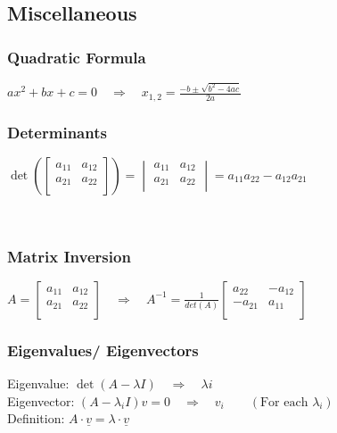 	\subsection{Miscellaneous}
	\begin{minipage}[t]{9.5cm}
		\subsubsection{Quadratic Formula}
			$ax^2+bx+c=0\quad\Rightarrow\quad x_{1,2}=\frac{-b\pm\sqrt{b^2-4ac}}{2a}$
	\end{minipage}
	\hfill
	\begin{minipage}[t]{9.5cm}
		\subsubsection{Determinants}
			$\det\left(
			\begin{bmatrix}
				a_{11}&a_{12}\\
				a_{21}&a_{22}\\
			\end{bmatrix}\right)=
			\begin{vmatrix}
				a_{11}&a_{12}\\
				a_{21}&a_{22}\\
			\end{vmatrix}=a_{11}a_{22}-a_{12}a_{21}$
	\end{minipage}\\


	\begin{minipage}[t]{9.5cm}
		\subsubsection{Matrix Inversion}
			$A=\begin{bmatrix}
						a_{11}&a_{12}\\
						a_{21}&a_{22}\\
				\end{bmatrix}\quad\Rightarrow\quad
			A^{-1}=\frac{1}{det(A)}
			\begin{bmatrix}
				a_{22}&-a_{12}\\
				-a_{21}&a_{11}\\
			\end{bmatrix}$
	\end{minipage}
	\hfill
	\begin{minipage}[t]{9.5cm}
		\subsubsection{Eigenvalues/ Eigenvectors}
			Eigenvalue: $\det(A-\lambda I)\quad\Rightarrow\quad \lambda i$\\
			Eigenvector: $(A-\lambda_i I)v=0\quad\Rightarrow\quad v_i\qquad(\text{For each }\lambda_i)$\\
			Definition: $ A\cdot \underline{v} = \lambda \cdot \underline{v} $
	\end{minipage}


